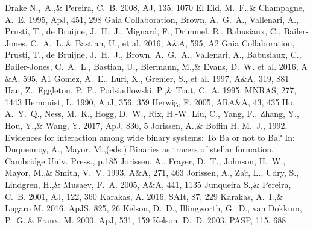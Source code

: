 \documentclass[a4paper,fleqn,usenatbib]{mnras}
\begin{document}
\begin{thebibliography}{99}
Drake N.,~A.,\& Pereira, C.~B. 2008, 
AJ, 135, 1070
El Eid, M.~F.,\& Champagne, A.~E. 1995, 
ApJ, 451, 298
Gaia Collaboration, Brown, A.~G.~A., Vallenari, A., Prusti, T., de Bruijne, J.~H.~J., Mignard, F., Drimmel, R., Babusiaux, C., Bailer-Jones, C.~A.~L.,\& Bastian, U., et al. 2016, 
A$\&$A, 595, A2
Gaia Collaboration, Prusti, T., de Bruijne, J.~H.~J., Brown, A.~G.~A., Vallenari, A., Babusiaux, C., Bailer-Jones, C.~A.~L., Bastian, U., Biermann, M.,\& Evans, D.~W. et al. 2016, 
A$\&$A, 595, A1
Gomez, A.~E., Luri, X., Grenier, S., et al. 1997, 
A$\&$A, 319, 881
Han, Z., Eggleton, P.~P., Podsiadlowski, P.,\& Tout, C.~A. 1995, 
MNRAS, 277, 1443
Hernquist, L. 1990, 
ApJ, 356, 359
Herwig, F. 2005, 
ARA$\&$A, 43, 435
Ho, A.~Y.~Q., Ness, M.~K., Hogg, D.~W., Rix, H.-W. Liu, C., Yang, F., Zhang, Y., Hou, Y.,\& Wang, Y. 2017, 
ApJ, 836, 5
Jorissen, A.,\& Boffin H, M.~J., 1992, 
Evidences for interaction among wide binary systems: To Ba or not to Ba? In: Duquennoy, A., Mayor, M.,(eds.) Binaries as tracers of stellar formation. Cambridge Univ. Press., p.185
Jorissen, A., Frayer, D.~T., Johnson, H.~W., Mayor, M.,\& Smith, V.~V. 1993, 
A$\&$A, 271, 463
Jorissen, A., Za$\check{c}$, L., Udry, S., Lindgren, H.,\& Musaev, F.~A. 2005, 
A$\&$A, 441, 1135
Junqueira S.,\& Pereira, C.~B. 2001, 
AJ, 122, 360
Karakas, A. 2016, 
SAIt, 87, 229
Karakas, A.~I.,\& Lugaro M. 2016, 
ApJS, 825, 26
Kelson, D.~D., Illingworth, G.~D., van Dokkum, P.~G.,\& Franx, M. 2000, ApJ, 531, 159
Kelson, D.~D. 2003, 
PASP, 115, 688

\end{thebibliography}
\end{document}
